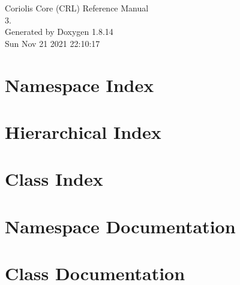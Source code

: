 \documentclass[a4paper]{socbook}
\begin{document}
   \begin{titlepage}
     \vspace*{7cm}
     \begin{center}
     {\Large Coriolis Core (\+C\+R\+L) Reference Manual\\[1ex]\large 3. }\\
     \vspace*{1cm}
     {\large Generated by Doxygen 1.8.14}\\
     \vspace*{0.5cm}
     {\small Sun Nov 21 2021 22:10:17}\\
     \end{center}
   \end{titlepage}

   \clearemptydoublepage

   \tableofcontents
   \clearemptydoublepage

\chapter{Namespace Index}

\chapter{Hierarchical Index}

\chapter{Class Index}

\chapter{Namespace Documentation}


\chapter{Class Documentation}















\backmatter
\newpage
{}
\clearemptydoublepage
{}
\printindex
\end{document}
